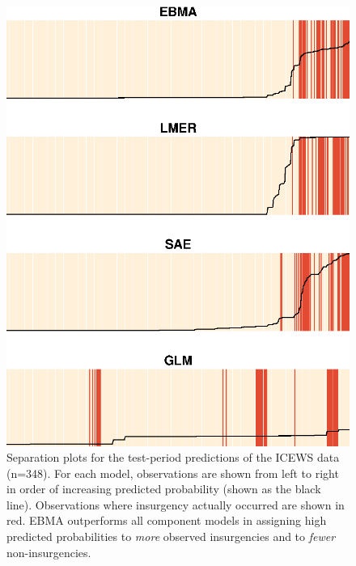 \documentclass[12pt,fullpage,endnotes]{article}
\begin{document}
\begin{figure}[h!]
 \caption{\footnotesize Separation plots for the test-period
    predictions of the ICEWS data (n=348).  For each model,
    observations are shown from left to right in order of increasing
    predicted probability (shown as the black line).  Observations
    where insurgency actually occurred are shown in red.  EBMA
    outperforms all component models in assigning high predicted
    probabilities to \textit{more} observed insurgencies and to
    \textit{fewer} non-insurgencies.}
\label{OutSam1sep}
\begin{center}
\includegraphics{Outsample}
\end{center}
\end{figure}
\end{document}
